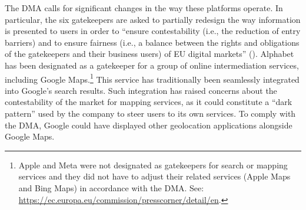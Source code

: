 \documentclass[11pt]{article}
\begin{document}
	The DMA calls for significant changes in the way these platforms operate. In particular, the six gatekeepers are asked to partially redesign the way information is presented to users in order to ``ensure contestability (i.e., the reduction of entry barriers) and to ensure fairness (i.e., a balance between the rights and obligations of the gatekeepers and their business users) of EU digital markets'' 
	(\citealp{de2024implementing}). Alphabet has been designated as a gatekeeper for a group of online intermediation services, including Google Maps.\footnote{Apple and Meta were not designated as gatekeepers for search or mapping services and they did not have to adjust their related services (Apple Maps and Bing Maps) in accordance with the DMA. See: \href{https://ec.europa.eu/commission/presscorner/detail/en/ip_23_4328}{https://ec.europa.eu/commission/presscorner/detail/en}.} This service has traditionally been seamlessly integrated into Google's search results. Such integration has raised concerns about the contestability of the market for mapping services, as it could constitute a ``dark pattern'' used by the company to steer users to its own services. To comply with the DMA, Google could have displayed other geolocation applications alongside Google Maps. 
\end{document}
